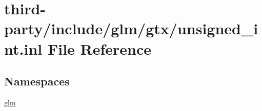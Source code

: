 \hypertarget{unsigned__int_8inl}{}\section{third-\/party/include/glm/gtx/unsigned\+\_\+int.inl File Reference}
\label{unsigned__int_8inl}
\subsection*{Namespaces}
\begin{DoxyCompactItemize}
\item 
 \hyperlink{namespaceglm}{glm}
\end{DoxyCompactItemize}
